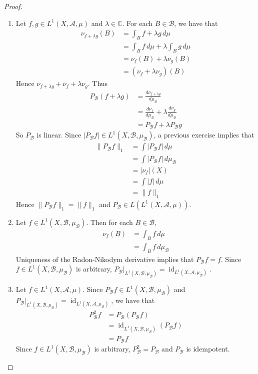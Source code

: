 \documentclass[12pt]{amsart}
\theoremstyle{definition}
\newcommand{\lam}{\lambda}
\newcommand{\C}{\mathbb{C}}
\newcommand{\MA}{\mathcal{A}}
\newcommand{\MB}{\mathcal{B}}
\newcommand{\dmu}{\, d \mu}
\DeclareMathOperator{\id}{id}
\begin{document}
	\begin{proof}\
		\begin{enumerate}
			\item Let $f, g \in L^1(X, \MA, \mu)$ and $\lam \in \C$. For each $B \in \MB$, we have that 
			\begin{align*}
				\nu_{f + \lam g} (B) 
				& = \int_{B} f + \lam g \dmu \\
				& = \int_{B} f  \dmu + \lam \int_{B} g \dmu \\
				& = \nu_{f}(B) + \lam \nu_{g}(B) \\
				& = (\nu_{f} + \lam \nu_{g})(B)
			\end{align*}
			Hence $\nu_{f + \lam g} + \nu_{f} + \lam \nu_{g}$. Thus 
			\begin{align*}
				P_{\MB}(f + \lam g)
				& = \frac{d \nu_{f + \lam g}}{d \mu_{\MB}} \\
				& = \frac{d \nu_f }{d \mu_{\MB}} + \lam \frac{d \nu_{g}}{d \mu_{\MB}} \\
				& = P_{\MB} f + \lam P_{\MB} g
			\end{align*}
			So $P_{\MB}$ is linear. Since $|P_{\MB}f| \in L^1(X, \MB, \mu_{\MB})$, a previous exercise implies that
			\begin{align*}
				\|P_{\MB}f\|_1
				& = \int |P_{\MB}f| \dmu \\
				& = \int |P_{\MB}f| \dmu_{\MB} \\
				& = |\nu_{f}|(X) \\
				& = \int |f| \dmu \\
				& = \|f\|_1
			\end{align*}
			Hence $\|P_{\MB} f \|_1 = \|f\|_1$ and $P_{\MB} \in L(L^1(X, \MA, \mu))$.
			\item Let $f \in L^1(X, \MB, \mu_{\MB})$. Then for each $B \in \MB$, 
			\begin{align*}
				\nu_f(B)
				& = \int_B f \dmu \\
				& = \int_B f \dmu_{\MB} 
			\end{align*}
			Uniqueness of the Radon-Nikodym derivative implies that $P_{\MB}f = f$. Since $f \in L^1(X, \MB, \mu_{\MB})$ is arbitrary, $P_{\MB}|_{L^1(X, \MB, \mu_{\MB})} = \id_{L^1(X, \MA, \mu_{\MB})}$.
			\item Let $f \in L^1(X, \MA, \mu)$. Since $P_{\MB}f \in L^1(X, \MB, \mu_{\MB})$ and $P_{\MB}|_{L^1(X, \MB, \mu_{\MB})} = \id_{L^1(X, \MA, \mu_{\MB})}$, we have that
			\begin{align*}
				P_{\MB}^2 f 
				& = P_{\MB}(P_{\MB} f) \\
				& = \id_{L^1(X, \MB, \mu_{\MB})} (P_{\MB} f) \\
				& = P_{\MB}f
			\end{align*}
			Since $f \in L^1(X, \MB, \mu_{\MB})$ is arbitrary, $P_{\MB}^2 = P_{\MB}$ and $P_{\MB}$ is idempotent. 
		\end{enumerate}
	\end{proof}
\end{document}
